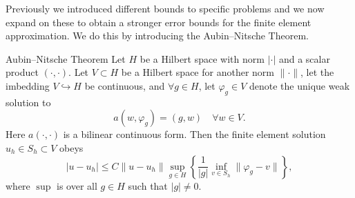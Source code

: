 Previously we introduced different bounds to specific problems and we now expand on these to obtain a stronger error bounds for the finite element approximation. 
We do this by introducing the Aubin–Nitsche Theorem.
\begin{thmx}{Aubin–Nitsche Theorem\label{thm:aubin-nitsche}}
    Let $H$ be a Hilbert space with norm $|\cdot|$ and a scalar product $(\cdot,\cdot)$.
    Let $V\subset H$ be a Hilbert space for another norm $\|\cdot\|$, let the imbedding
    $V \hookrightarrow H$ be continuous,
    and $\forall g \in H$, let $\varphi_g \in V$ denote the unique weak solution to 
    \begin{equation}
        a(w,\varphi_g) = (g,w) \quad \forall w\in V. \label{eq:aubin_nitsche_antagelse}
    \end{equation}
    Here $a(\cdot,\cdot)$ is a bilinear continuous form.
    Then the finite element solution $u_h\in S_h \subset V$ obeys
    \begin{equation*}
        |u-u_h| \leq C \|u-u_h\| \sup_{g\in H} \left \{ \frac{1}{|g|} \inf_{v \in S_h} \|\varphi_g - v\| \right \},
    \end{equation*}
    where $\sup$ is over all $g\in H$ such that $|g|\neq 0$.
\end{thmx}
